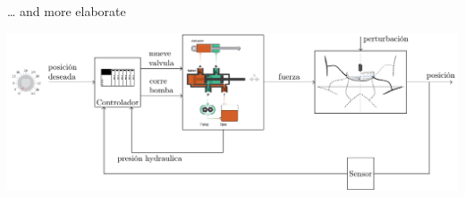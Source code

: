 \documentclass[presentation,aspectratio=169]{beamer}
\begin{document}
\begin{frame}[label={sec:org05034be}]{\ldots{} and more elaborate}
\begin{center}
\includegraphics[width=.99\textwidth]{../../figures/ac75-control-block-details}
\end{center}
\end{frame}
\end{document}
